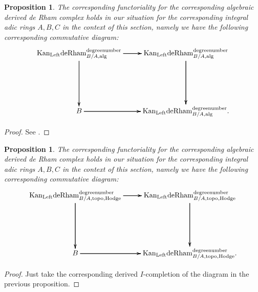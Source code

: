 \documentclass[11pt]{book}
\newtheorem{proposition}[theorem]{Proposition}
\theoremstyle{definition}
\numberwithin{equation}{section}
\begin{document}


\begin{proposition}
The corresponding functoriality for the corresponding algebraic derived de Rham complex holds in our situation for the corresponding integral adic rings $A,B,C$ in the context of this section, namely we have the following corresponding commutative diagram:
\[
\xymatrix@C+0pc@R+3pc{
\mathrm{Kan}_\mathrm{Left}\mathrm{deRham}^\text{degreenumber}_{B/A,\mathrm{alg}} \ar[r] \ar[r] \ar[r]\ar[d] \ar[d] \ar[d] &\mathrm{Kan}_\mathrm{Left}\mathrm{deRham}^\text{degreenumber}_{B/A,\mathrm{alg}} \ar[d] \ar[d] \ar[d]\\
B \ar[r] \ar[r] \ar[r] &\mathrm{Kan}_\mathrm{Left}\mathrm{deRham}^\text{degreenumber}_{B/A,\mathrm{alg}}.
}
\]	
\end{proposition}

\begin{proof}
See \cite[Lemma 3.3]{12GL}.	
\end{proof} 


\begin{proposition}
The corresponding functoriality for the corresponding algebraic derived de Rham complex holds in our situation for the corresponding integral adic rings $A,B,C$ in the context of this section, namely we have the following corresponding commutative diagram:
\[
\xymatrix@C+0pc@R+3pc{
\mathrm{Kan}_\mathrm{Left}\mathrm{deRham}^\text{degreenumber}_{B/A,\mathrm{topo,Hodge}} \ar[r] \ar[r] \ar[r]\ar[d] \ar[d] \ar[d] &\mathrm{Kan}_\mathrm{Left}\mathrm{deRham}^\text{degreenumber}_{B/A,\mathrm{topo,Hodge}} \ar[d] \ar[d] \ar[d]\\
B \ar[r] \ar[r] \ar[r] &\mathrm{Kan}_\mathrm{Left}\mathrm{deRham}^\text{degreenumber}_{B/A,\mathrm{topo,Hodge}}.
}
\]	
\end{proposition}

\begin{proof}
Just take the corresponding derived $I$-completion of the diagram in the previous proposition.	
\end{proof} 



\end{document}
